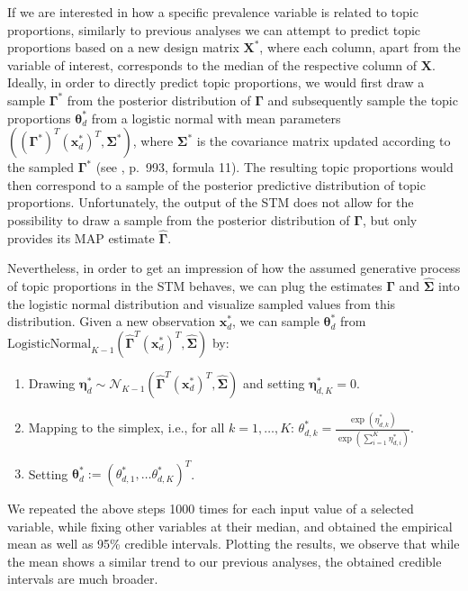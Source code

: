 If we are interested in how a specific prevalence variable is related to topic proportions, similarly to previous analyses we can attempt to predict topic proportions based on a new design matrix $\boldsymbol{X}^*$, where each column, apart from the variable of interest, corresponds to the median of the respective column of $\boldsymbol{X}$. Ideally, in order to directly predict topic proportions, we would first draw a sample $\boldsymbol{\Gamma}^*$ from the posterior distribution of $\boldsymbol{\Gamma}$ and subsequently sample the topic proportions $\boldsymbol{\theta}_d^*$ from a logistic normal with mean parameters $((\boldsymbol{\Gamma}^*)^T (\boldsymbol{x}_d^*)^T, \boldsymbol{\Sigma}^*)$, where $\boldsymbol{\Sigma}^*$ is the covariance matrix updated according to the sampled $\boldsymbol{\Gamma}^*$ (see \citealp{roberts2016model}, p.\ 993, formula 11). The resulting topic proportions would then correspond to a sample of the posterior predictive distribution of topic proportions. Unfortunately, the output of the STM does not allow for the possibility to draw a sample from the posterior distribution of $\boldsymbol{\Gamma}$, but only provides its MAP estimate $\hat{\boldsymbol{\Gamma}}$. 

Nevertheless, in order to get an impression of how the assumed generative process of topic proportions in the STM behaves, we can plug the estimates $\hat{\boldsymbol{\Gamma}}$ and $\hat{\boldsymbol{\Sigma}}$ into the logistic normal distribution and visualize sampled values from this distribution. Given a new observation $\boldsymbol{x}_d^*$, we can sample $\boldsymbol{\theta}_d^*$ from $\text{LogisticNormal}_{K-1}(\hat{\boldsymbol{\Gamma}}^T(\boldsymbol{x}_d^*)^T, \hat{\boldsymbol{\Sigma}})$ by:

\begin{enumerate}
\item Drawing $\boldsymbol{\eta}_d^* \sim \mathcal{N}_{K-1}(\hat{\boldsymbol{\Gamma}}^T(\boldsymbol{x}_d^*)^T, \hat{\boldsymbol{\Sigma}})$ and setting $\boldsymbol{\eta}^*_{d,K} = 0$.
\item Mapping to the simplex, i.e., for all $k = 1,\dots,K$: $\theta_{d,k}^* = \frac{\exp(\eta^*_{d,k})}{\exp(\sum_{i=1}^{K} \eta^*_{d,i})}$.
\item Setting $\boldsymbol{\theta}_d^* := (\theta_{d,1}^*, \dots \theta_{d,K}^*)^T$.
\end{enumerate}

We repeated the above steps 1000 times for each input value of a selected variable, while fixing other variables at their median, and obtained the empirical mean as well as 95\% credible intervals. Plotting the results, we observe that while the mean shows a similar trend to our previous analyses, the obtained credible intervals are much broader.

